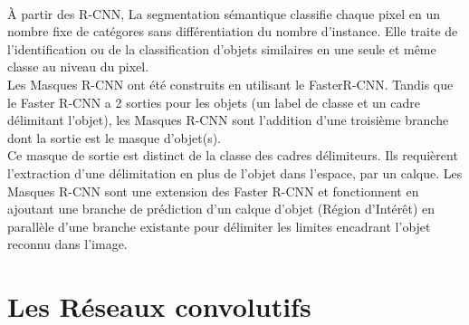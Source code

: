 \documentclass[
10pt, %
a4paper, %
oneside, %
headinclude,footinclude, %
]{scrartcl}
\begin{document}
\paragraph{}À partir des \gls{R-CNN}, La segmentation sémantique classifie chaque pixel en un nombre fixe de catégores sans différentiation du nombre d’instance. Elle traite de l’identification ou de la classification d’objets similaires en une seule et même classe au niveau du pixel.\\
Les Masques R-CNN ont été construits en utilisant le \gls{FasterR-CNN}. Tandis que le Faster R-CNN a 2 sorties pour les objets (un label de classe et un cadre délimitant l’objet), les Masques R-CNN sont l’addition d’une troisième branche dont la sortie est le masque d’objet(s).
\\
Ce masque de sortie est distinct de la classe des cadres délimiteurs. Ils requièrent l’extraction d’une délimitation en plus de l’objet dans l’espace, par un calque. Les Masques R-CNN sont une extension des Faster R-CNN et fonctionnent en ajoutant une branche de prédiction d’un calque d’objet (Région d’Intérêt) en parallèle d’une branche existante pour délimiter les limites encadrant l’objet reconnu dans l’image.


\section{Les Réseaux convolutifs}

\end{document}
